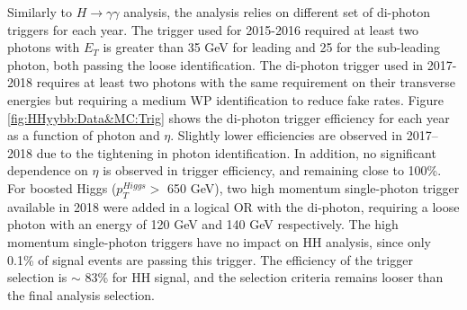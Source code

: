 Similarly to $H\rightarrow\gamma\gamma$ analysis, the \HHyybb analysis relies on different set of di-photon triggers for each year. The trigger used for 2015-2016 required at least two photons with $E_T$ is greater than 35 GeV for leading and 25 for the sub-leading photon, both passing the loose identification. The di-photon trigger used in 2017-2018 requires at least two photons with the same requirement on their transverse energies but requiring a medium WP identification to reduce fake rates. Figure \ref{fig:HHyybb:Data&MC:Trig} shows the di-photon trigger efficiency for each year as a function of photon \eT and $\eta$. Slightly lower efficiencies are observed in 2017–2018 due to the tightening in photon identification. In addition, no significant dependence on $\eta$ is observed in trigger efficiency, and remaining close to 100\%. For boosted Higgs ($p_T^{Higgs} > $ 650 GeV), two high momentum single-photon trigger available in 2018 were added in a logical OR with the di-photon, requiring a loose photon with an energy of 120 GeV and 140 GeV respectively. The high momentum single-photon triggers have no impact on HH analysis, since only 0.1\% of signal events are passing this trigger. The efficiency of the trigger selection is $\sim$ 83\% for HH signal, and the selection criteria remains looser than the final analysis selection. 


